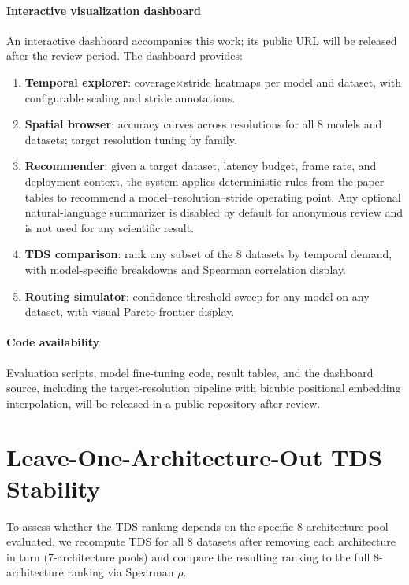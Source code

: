 \documentclass[a4paper, 10pt, conference, onecolumn]{ieeeconf}
\newcommand{\TDS}{\textsc{TDS}}
\begin{document}
\paragraph{Interactive visualization dashboard}
An interactive dashboard accompanies this work; its public URL will be released after the review period. The dashboard provides:
\begin{enumerate}
\item \textbf{Temporal explorer}: coverage$\times$stride heatmaps per model and
  dataset, with configurable scaling and stride annotations.
\item \textbf{Spatial browser}: accuracy curves across resolutions for all
  8 models and datasets; target resolution tuning by family.
\item \textbf{Recommender}: given a target dataset, latency budget, frame rate,
  and deployment context, the system applies deterministic rules from the paper
  tables to recommend a model--resolution--stride operating point. Any optional
  natural-language summarizer is disabled by default for anonymous review and is
  not used for any scientific result.
\item \textbf{TDS comparison}: rank any subset of the 8 datasets by temporal demand,
  with model-specific breakdowns and Spearman correlation display.
\item \textbf{Routing simulator}: confidence threshold sweep for any model on any dataset,
  with visual Pareto-frontier display.
\end{enumerate}


\paragraph{Code availability}
Evaluation scripts, model fine-tuning code, result tables, and the dashboard source, including the target-resolution pipeline with bicubic positional embedding interpolation, will be released in a public repository after review.

\section{Leave-One-Architecture-Out \texorpdfstring{\TDS{}}{TDS} Stability}
\label{sec:sup_loo}

To assess whether the \TDS{} ranking depends on the specific 8-architecture pool evaluated, we recompute \TDS{} for all 8 datasets after removing each architecture in turn (7-architecture pools) and compare the resulting ranking to the full 8-architecture ranking via Spearman $\rho$.
\end{document}
